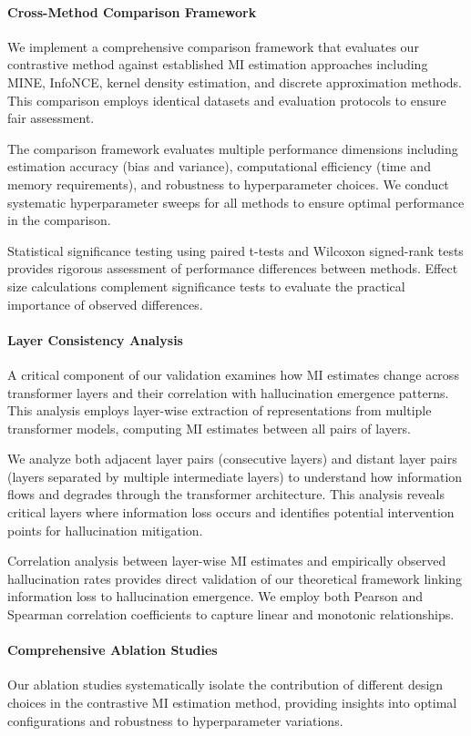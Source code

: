\paragraph{Cross-Method Comparison Framework}
We implement a comprehensive comparison framework that evaluates our contrastive method against established MI estimation approaches including MINE, InfoNCE, kernel density estimation, and discrete approximation methods. This comparison employs identical datasets and evaluation protocols to ensure fair assessment.

The comparison framework evaluates multiple performance dimensions including estimation accuracy (bias and variance), computational efficiency (time and memory requirements), and robustness to hyperparameter choices. We conduct systematic hyperparameter sweeps for all methods to ensure optimal performance in the comparison.

Statistical significance testing using paired t-tests and Wilcoxon signed-rank tests provides rigorous assessment of performance differences between methods. Effect size calculations complement significance tests to evaluate the practical importance of observed differences.

\paragraph{Layer Consistency Analysis}
A critical component of our validation examines how MI estimates change across transformer layers and their correlation with hallucination emergence patterns. This analysis employs layer-wise extraction of representations from multiple transformer models, computing MI estimates between all pairs of layers.

We analyze both adjacent layer pairs (consecutive layers) and distant layer pairs (layers separated by multiple intermediate layers) to understand how information flows and degrades through the transformer architecture. This analysis reveals critical layers where information loss occurs and identifies potential intervention points for hallucination mitigation.

Correlation analysis between layer-wise MI estimates and empirically observed hallucination rates provides direct validation of our theoretical framework linking information loss to hallucination emergence. We employ both Pearson and Spearman correlation coefficients to capture linear and monotonic relationships.

\paragraph{Comprehensive Ablation Studies}
Our ablation studies systematically isolate the contribution of different design choices in the contrastive MI estimation method, providing insights into optimal configurations and robustness to hyperparameter variations.


